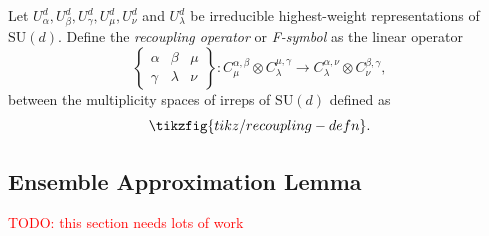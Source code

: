 \documentclass[notitlepage]{article}
\begin{document}
\begin{defn}[F-Symbols]
    Let $U_{\alpha}^{d}, U_{\beta}^{d}, U_{\gamma}^{d}, U_{\mu}^{d}, U_{\nu}^{d}$ and $U_{\lambda}^{d}$ be irreducible highest-weight representations of $\mathrm{SU}(d)$.
    Define the \textit{recoupling operator} or \textit{F-symbol} as the linear operator
    \begin{equation}
        \begin{Bmatrix}\alpha & \beta & \mu \\ \gamma & \lambda & \nu \end{Bmatrix}
        :
        C_{\mu}^{\alpha,\beta} \otimes C_{\lambda}^{\mu,\gamma} \to C_{\lambda}^{\alpha, \nu} \otimes C_{\nu}^{\beta,\gamma},
    \end{equation}
    between the multiplicity spaces of irreps of $\mathrm{SU}(d)$ defined as
    \begin{equation}
        \tikzfig{tikz/recoupling-defn}.
    \end{equation}
\end{defn}

\subsection{Ensemble Approximation Lemma}

\textcolor{red}{TODO: this section needs lots of work}
\end{document}
